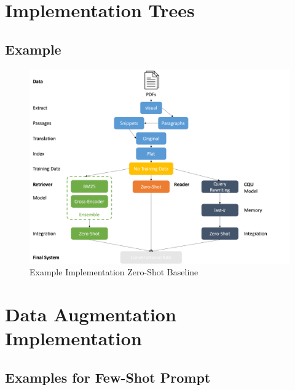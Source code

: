 \section{Implementation Trees}
\label{ref:appendixA-implementation}

\subsection{Example}

\begin{figure}[H]
    \centering
    \includegraphics[width=\textwidth]{Grafiken/example_decission_tree.png}
    \caption{Example Implementation Zero-Shot Baseline}
    \label{fig:example-implementation-tree}
\end{figure}

\section{Data Augmentation Implementation}
\label{ref:appendixA-data-augmentation}

\subsection{Examples for Few-Shot Prompt}
\label{ref:appendixA-data-augmentation-few-shot-prompt}

